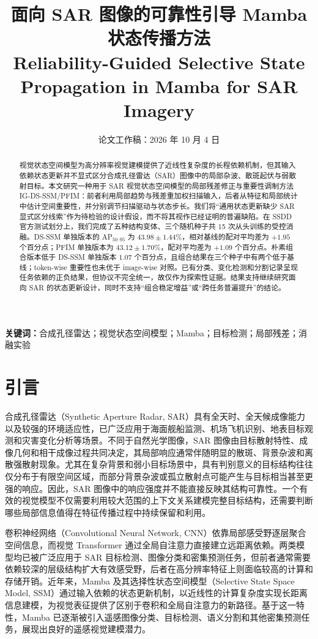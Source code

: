 \documentclass[UTF8,12pt,a4paper]{ctexart}
\title{面向 SAR 图像的可靠性引导 Mamba 状态传播方法\\
\large Reliability-Guided Selective State Propagation in Mamba for SAR Imagery}
\author{}
\date{论文工作稿：2026 年 10 月 4 日}
\begin{document}
\maketitle

\begin{abstract}
视觉状态空间模型为高分辨率视觉建模提供了近线性复杂度的长程依赖机制，但其输入依赖状态更新并不显式区分合成孔径雷达（SAR）图像中的局部杂波、散斑起伏与弱散射目标。本文研究一种用于 SAR 视觉状态空间模型的局部残差修正与重要性调制方法 IG-DS-SSM/PFIM：前者利用局部趋势与残差重加权扫描输入，后者从特征和局部统计中估计空间重要性，并分别调节扫描驱动与状态步长。我们将“通用状态更新缺少 SAR 显式区分线索”作为待检验的设计假设，而不将其视作已经证明的普遍缺陷。在 SSDD 官方测试划分上，我们完成了五种结构变体、三个随机种子共 15 次从头训练的受控消融。DS-SSM 单独版本的 AP$_{50:95}$ 为 $43.98\pm1.44\%$，相对基线的配对平均差为 $+1.95$ 个百分点；PFIM 单独版本为 $43.12\pm1.70\%$，配对平均差为 $+1.09$ 个百分点。朴素组合版本低于 DS-SSM 单独版本 $1.07$ 个百分点，且组合结果在三个种子中有两个低于基线；token-wise 重要性也未优于 image-wise 对照。已有分类、变化检测和分割记录呈现任务依赖的正负结果，但协议不完全统一，故仅作为探索性证据。结果支持继续研究面向 SAR 的状态更新设计，同时不支持“组合稳定增益”或“跨任务普遍提升”的结论。
\end{abstract}
\noindent\textbf{关键词：}合成孔径雷达；视觉状态空间模型；Mamba；目标检测；局部残差；消融实验

\section{引言}

合成孔径雷达（Synthetic Aperture Radar, SAR）具有全天时、全天候成像能力以及较强的环境适应性，已广泛应用于海面舰船监测、机场飞机识别、地表目标观测和灾害变化分析等场景。不同于自然光学图像，SAR 图像由目标散射特性、成像几何和相干成像过程共同决定，其局部响应通常伴随明显的散斑、背景杂波和离散强散射现象。尤其在复杂背景和弱小目标场景中，具有判别意义的目标结构往往仅分布于有限空间区域，而部分背景杂波或孤立散射点可能产生与目标相当甚至更强的响应。因此，SAR 图像中的响应强度并不能直接反映其结构可靠性。一个有效的视觉模型不仅需要利用较大范围的上下文关系建模完整目标结构，还需要判断哪些局部信息值得在特征传播过程中持续保留和利用。

卷积神经网络（Convolutional Neural Network, CNN）依靠局部感受野逐层聚合空间信息，而视觉 Transformer 通过全局自注意力直接建立远距离依赖。两类模型均已被广泛应用于 SAR 目标检测、图像分类和密集预测任务，但前者通常需要依赖较深的层级结构扩大有效感受野，后者在高分辨率特征上则面临较高的计算和存储开销。近年来，Mamba 及其选择性状态空间模型（Selective State Space Model, SSM）通过输入依赖的状态更新机制，以近线性的计算复杂度实现长距离信息建模，为视觉表征提供了区别于卷积和全局自注意力的新路径\cite{gu2023mamba,liu2024visionmamba}。基于这一特性，Mamba 已逐渐被引入遥感图像分类、目标检测、语义分割和其他密集预测任务\cite{rs_mamba,rstmtmamba,mambayolo,madinet}，展现出良好的遥感视觉建模潜力。
\end{document}
